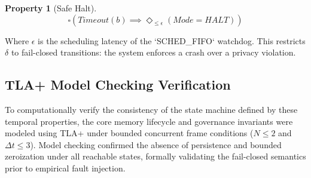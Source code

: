 \documentclass[conference]{IEEEtran}
\newtheorem{property}{Property}
\begin{document}
\begin{property}[Safe Halt]
\begin{equation}
\square \left( Timeout(b) \implies \Diamond_{\le \epsilon} (Mode = HALT) \right)
\end{equation}
\end{property}
Where $\epsilon$ is the scheduling latency of the `SCHED_FIFO` watchdog. This restricts $\delta$ to fail-closed transitions: the system enforces a crash over a privacy violation.

\subsection{TLA+ Model Checking Verification}
To computationally verify the consistency of the state machine defined by these temporal properties, the core memory lifecycle and governance invariants were modeled using TLA+ under bounded concurrent frame conditions ($N \le 2$ and $\Delta t \le 3$). Model checking confirmed the absence of persistence and bounded zeroization under all reachable states, formally validating the fail-closed semantics prior to empirical fault injection.
\end{document}
